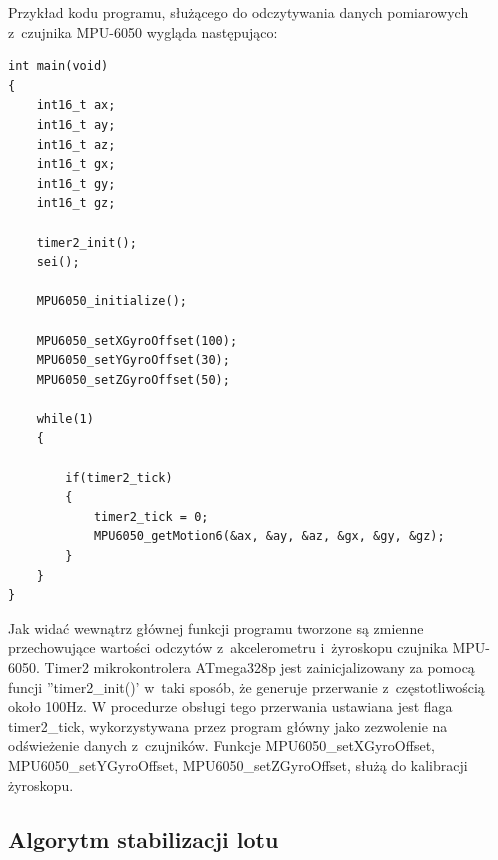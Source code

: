 \documentclass[11pt, twoside]{Thesis} %
\begin{document}
Przykład kodu programu, służącego do odczytywania danych pomiarowych z~czujnika MPU-6050 wygląda następująco:

\begin{lstlisting}
int main(void)
{
	int16_t ax;
	int16_t ay;
	int16_t az;
	int16_t gx;
	int16_t gy;
	int16_t gz;

	timer2_init();
	sei();

	MPU6050_initialize();

	MPU6050_setXGyroOffset(100);
	MPU6050_setYGyroOffset(30);
	MPU6050_setZGyroOffset(50);

	while(1)
	{
		
		if(timer2_tick)
		{
			timer2_tick = 0;
			MPU6050_getMotion6(&ax, &ay, &az, &gx, &gy, &gz);
		}
	}
}
\end{lstlisting}

Jak widać wewnątrz głównej funkcji programu tworzone są zmienne przechowujące wartości odczytów z~akcelerometru i~żyroskopu czujnika MPU-6050. Timer2 mikrokontrolera ATmega328p jest zainicjalizowany za pomocą funcji ''timer2\_init()' w~taki sposób, że generuje przerwanie z~częstotliwością około 100Hz. W procedurze obsługi tego przerwania ustawiana jest flaga timer2\_tick, wykorzystywana przez program główny jako zezwolenie na odświeżenie danych z~czujników. Funkcje MPU6050\_setXGyroOffset, MPU6050\_setYGyroOffset, MPU6050\_setZGyroOffset, służą do kalibracji żyroskopu.

\subsection{Algorytm stabilizacji lotu}
\end{document}
